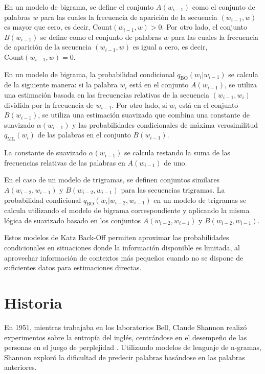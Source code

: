 En un modelo de bigrama, se define el conjunto $A(w_{i-1})$ como el conjunto de palabras $w$ para las cuales la frecuencia de aparición de la secuencia $(w_{i-1}, w)$ es mayor que cero, es decir, $\text{Count}(w_{i-1}, w) > 0$. Por otro lado, el conjunto $B(w_{i-1})$ se define como el conjunto de palabras $w$ para las cuales la frecuencia de aparición de la secuencia $(w_{i-1}, w)$ es igual a cero, es decir, $\text{Count}(w_{i-1}, w) = 0$.

En un modelo de bigrama, la probabilidad condicional $q_{\text{BO}}(w_i | w_{i-1})$ se calcula de la siguiente manera: si la palabra $w_i$ está en el conjunto $A(w_{i-1})$, se utiliza una estimación basada en las frecuencias relativas de la secuencia $(w_{i-1}, w_i)$ dividida por la frecuencia de $w_{i-1}$. Por otro lado, si $w_i$ está en el conjunto $B(w_{i-1})$, se utiliza una estimación suavizada que combina una constante de suavizado $\alpha(w_{i-1})$ y las probabilidades condicionales de máxima verosimilitud $q_{\text{ML}}(w_i)$ de las palabras en el conjunto $B(w_{i-1})$.

La constante de suavizado $\alpha(w_{i-1})$ se calcula restando la suma de las frecuencias relativas de las palabras en $A(w_{i-1})$ de uno.

En el caso de un modelo de trigramas, se definen conjuntos similares $A(w_{i-2}, w_{i-1})$ y $B(w_{i-2}, w_{i-1})$ para las secuencias trigramas. La probabilidad condicional $q_{\text{BO}}(w_i | w_{i-2}, w_{i-1})$ en un modelo de trigramas se calcula utilizando el modelo de bigrama correspondiente y aplicando la misma lógica de suavizado basado en los conjuntos $A(w_{i-2}, w_{i-1})$ y $B(w_{i-2}, w_{i-1})$.

Estos modelos de Katz Back-Off permiten aproximar las probabilidades condicionales en situaciones donde la información disponible es limitada, al aprovechar información de contextos más pequeños cuando no se dispone de suficientes datos para estimaciones directas.

\section{Historia}
En 1951, mientras trabajaba en los laboratorios Bell, Claude Shannon realizó experimentos sobre la entropía del inglés, centrándose en el desempeño de las personas en el juego de perplejidad \cite{shannon1951prediction}. Utilizando modelos de lenguaje de n-gramas, Shannon exploró la dificultad de predecir palabras basándose en las palabras anteriores.

